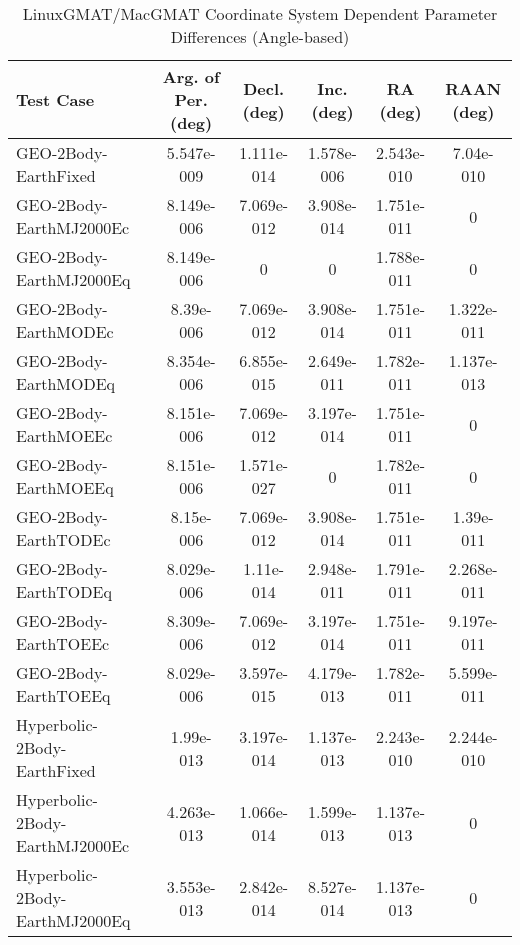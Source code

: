 \begin{table}[htbp!]
\centering
\caption{ LinuxGMAT/MacGMAT Coordinate System Dependent Parameter Differences (Angle-based)}
      \begin{tabular}{lccccc}
      \hline\hline
          Test Case & Arg. of Per. (deg) & Decl. (deg) & Inc. (deg) & RA (deg) & RAAN (deg) \\
         \hline
         GEO-2Body-EarthFixed & 5.547e-009 & 1.111e-014 & 1.578e-006 & 2.543e-010 & 7.04e-010 \\
         GEO-2Body-EarthMJ2000Ec & 8.149e-006 & 7.069e-012 & 3.908e-014 & 1.751e-011 & 0 \\
         GEO-2Body-EarthMJ2000Eq & 8.149e-006 & 0 & 0 & 1.788e-011 & 0 \\
         GEO-2Body-EarthMODEc & 8.39e-006 & 7.069e-012 & 3.908e-014 & 1.751e-011 & 1.322e-011 \\
         GEO-2Body-EarthMODEq & 8.354e-006 & 6.855e-015 & 2.649e-011 & 1.782e-011 & 1.137e-013 \\
         GEO-2Body-EarthMOEEc & 8.151e-006 & 7.069e-012 & 3.197e-014 & 1.751e-011 & 0 \\
         GEO-2Body-EarthMOEEq & 8.151e-006 & 1.571e-027 & 0 & 1.782e-011 & 0 \\
         GEO-2Body-EarthTODEc & 8.15e-006 & 7.069e-012 & 3.908e-014 & 1.751e-011 & 1.39e-011 \\
         GEO-2Body-EarthTODEq & 8.029e-006 & 1.11e-014 & 2.948e-011 & 1.791e-011 & 2.268e-011 \\
         GEO-2Body-EarthTOEEc & 8.309e-006 & 7.069e-012 & 3.197e-014 & 1.751e-011 & 9.197e-011 \\
         GEO-2Body-EarthTOEEq & 8.029e-006 & 3.597e-015 & 4.179e-013 & 1.782e-011 & 5.599e-011 \\
         Hyperbolic-2Body-EarthFixed & 1.99e-013 & 3.197e-014 & 1.137e-013 & 2.243e-010 & 2.244e-010 \\
         Hyperbolic-2Body-EarthMJ2000Ec & 4.263e-013 & 1.066e-014 & 1.599e-013 & 1.137e-013 & 0 \\
         Hyperbolic-2Body-EarthMJ2000Eq & 3.553e-013 & 2.842e-014 & 8.527e-014 & 1.137e-013 & 0 \\

\end{tabular}
\end{table}
